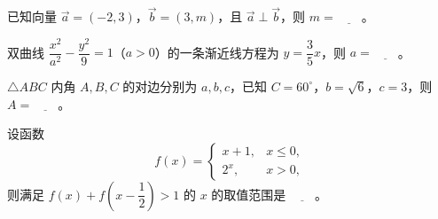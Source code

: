 \begin{question}
已知向量 \(\vec a=(-2,3)\)，\(\vec b=(3,m)\)，且 \(\vec a\perp\vec b\)，则 \(m=\underline{\qquad}\)。

\end{question}
\begin{question}
双曲线 \(\dfrac{x^2}{a^2}-\dfrac{y^2}{9}=1\)（\(a>0\)）的一条渐近线方程为 \(y=\dfrac{3}{5}x\)，则 \(a=\underline{\qquad}\)。

\end{question}
\begin{question}
\(\triangle ABC\) 内角 \(A,B,C\) 的对边分别为 \(a,b,c\)，已知 \(C=60^\circ\)，\(b=\sqrt{6}\)，\(c=3\)，则 \(A=\underline{\qquad}\)。

\end{question}
\begin{question}
设函数
\nopagebreak[4]
\[
f(x)=
\begin{cases}
x+1,&x\leq 0,\\
2^x,&x>0,
\end{cases}
\]
则满足 \(f(x)+f\left(x-\dfrac{1}{2}\right)>1\) 的 \(x\) 的取值范围是 \(\underline{\qquad}\)。

\end{question}

